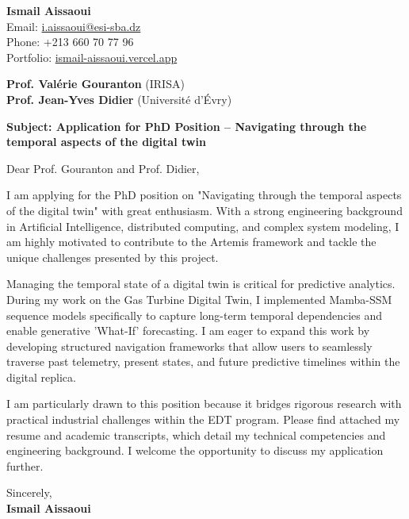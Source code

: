 \documentclass[11pt,a4paper]{article}
\begin{document}
\thispagestyle{empty}

\begin{flushright}
\textbf{Ismail Aissaoui} \\
Email: \href{mailto:i.aissaoui@esi-sba.dz}{i.aissaoui@esi-sba.dz} \\
Phone: +213 660 70 77 96 \\
Portfolio: \href{https://ismail-aissaoui.vercel.app}{ismail-aissaoui.vercel.app}
\end{flushright}

\vspace{1em}

\begin{flushleft}
\textbf{Prof. Valérie Gouranton} (IRISA) \\
\textbf{Prof. Jean-Yves Didier} (Université d’Évry)
\end{flushleft}

\vspace{1em}
\noindent\textbf{Subject: Application for PhD Position -- Navigating through the temporal aspects of the digital twin}
\vspace{1em}

\noindent Dear Prof. Gouranton and Prof. Didier,

\vspace{1em}
\noindent
I am applying for the PhD position on "Navigating through the temporal aspects of the digital twin" with great enthusiasm. With a strong engineering background in Artificial Intelligence, distributed computing, and complex system modeling, I am highly motivated to contribute to the Artemis framework and tackle the unique challenges presented by this project.

\vspace{0.5em}
\noindent
Managing the temporal state of a digital twin is critical for predictive analytics. During my work on the Gas Turbine Digital Twin, I implemented Mamba-SSM sequence models specifically to capture long-term temporal dependencies and enable generative 'What-If' forecasting. I am eager to expand this work by developing structured navigation frameworks that allow users to seamlessly traverse past telemetry, present states, and future predictive timelines within the digital replica.

\vspace{0.5em}
\noindent
I am particularly drawn to this position because it bridges rigorous research with practical industrial challenges within the EDT program. Please find attached my resume and academic transcripts, which detail my technical competencies and engineering background. I welcome the opportunity to discuss my application further.

\vspace{1.5em}
\noindent
Sincerely, \\[0.5em]
\textbf{Ismail Aissaoui}
\end{document}
